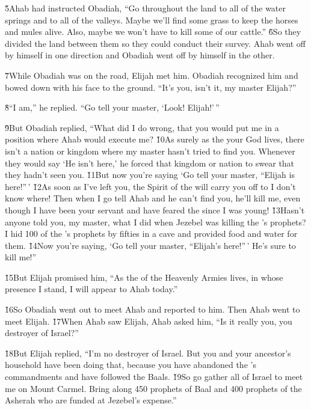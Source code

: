 \v{5}Ahab had instructed Obadiah, ``Go throughout the land to all of the water springs and to all of the valleys. Maybe we'll find some grass to keep the horses and mules alive. Also, maybe we won't have to kill some of our cattle.'' \v{6}So they divided the land between them so they could conduct their survey. Ahab went off by himself in one direction and Obadiah went off by himself in the other.

\v{7}While Obadiah was on the road, Elijah met him. Obadiah recognized him and bowed down with his face to the ground. ``It's you, isn't it, my master Elijah?''

\v{8}``I am,'' he replied. ``Go tell your master, `Look! Elijah!'\,''

\v{9}But Obadiah replied, ``What did I do wrong, that you would put me in a position where Ahab would execute me? \v{10}As surely as the  your God lives, there isn't a nation or kingdom where my master hasn't tried to find you. Whenever they would say `He isn't here,' he forced that kingdom or nation to swear that they hadn't seen you. \v{11}But now you're saying `Go tell your master, ``Elijah is here!''\,' \v{12}As soon as I've left you, the Spirit of the  will carry you off to I don't know where! Then when I go tell Ahab and he can't find you, he'll kill me, even though I have been your servant and have feared the  since I was young! \v{13}Hasn't anyone told you, my master, what I did when Jezebel was killing the 's prophets? I hid 100 of the 's prophets by fifties in a cave and provided food and water for them. \v{14}Now you're saying, `Go tell your master, ``Elijah's here!''\,' He's sure to kill me!''

\v{15}But Elijah promised him, ``As the  of the Heavenly Armies lives, in whose presence I stand, I will appear to Ahab today.''

\v{16}So Obadiah went out to meet Ahab and reported to him. Then Ahab went to meet Elijah. \v{17}When Ahab saw Elijah, Ahab asked him, ``Is it really you, you destroyer of Israel?''

\v{18}But Elijah replied, ``I'm no destroyer of Israel. But you and your ancestor's household have been doing that, because you have abandoned the 's commandments and have followed the Baals. \v{19}So go gather all of Israel to meet me on Mount Carmel. Bring along 450 prophets of Baal and 400 prophets of the Asherah who are funded at Jezebel's expense.''

